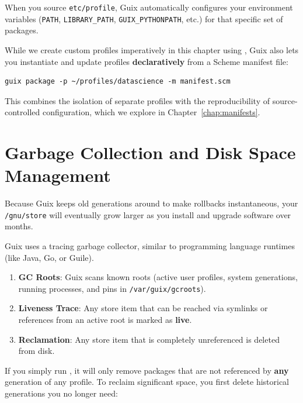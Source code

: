 When you source \texttt{etc/profile}, Guix automatically configures your environment variables (\texttt{PATH}, \texttt{LIBRARY\_PATH}, \texttt{GUIX\_PYTHONPATH}, etc.) for that specific set of packages.

\begin{protipbox}
While we create custom profiles imperatively in this chapter using , Guix also lets you instantiate and update profiles \textbf{declaratively} from a Scheme manifest file:
\begin{lstlisting}[style=guixcli]
guix package -p ~/profiles/datascience -m manifest.scm
\end{lstlisting}
This combines the isolation of separate profiles with the reproducibility of source-controlled configuration, which we explore in Chapter~\ref{chap:manifests}.
\end{protipbox}

\section{Garbage Collection and Disk Space Management}

Because Guix keeps old generations around to make rollbacks instantaneous, your \texttt{/gnu/store} will eventually grow larger as you install and upgrade software over months.

\begin{alchemybox}
Guix uses a tracing garbage collector, similar to programming language runtimes (like Java, Go, or Guile).
\begin{enumerate}
  \item \textbf{GC Roots}: Guix scans known roots (active user profiles, system generations, running processes, and pins in \texttt{/var/guix/gcroots}).
  \item \textbf{Liveness Trace}: Any store item that can be reached via symlinks or references from an active root is marked as \textbf{live}.
  \item \textbf{Reclamation}: Any store item that is completely unreferenced is deleted from disk.
\end{enumerate}
\end{alchemybox}

If you simply run , it will only remove packages that are not referenced by \textbf{any} generation of any profile. To reclaim significant space, you first delete historical generations you no longer need:

